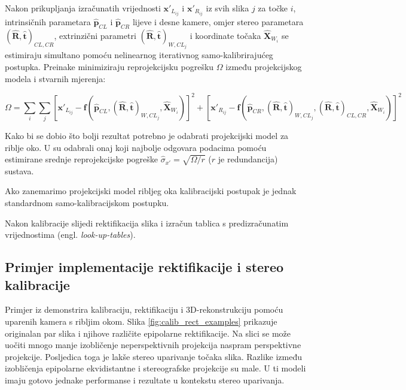 \documentclass[../seminar.tex]{subfiles}
\begin{document}
Nakon prikupljanja izračunatih vrijednosti $\boldsymbol{x'}_{L_{ij}}$ i $\boldsymbol{x'}_{R_{ij}}$ iz svih slika $j$ za točke $i$, intrinsičnih parametara $\hat{\boldsymbol{p}}_{CL}$ i $\hat{\boldsymbol{p}}_{CR}$ 
lijeve i desne kamere, omjer stereo parametara $(\hat{\boldsymbol{R}},\hat{\boldsymbol{t}})_{CL,CR}$, extrinzični parametri $(\hat{\boldsymbol{R}},\hat{\boldsymbol{t}})_{W,CL_j}$ 
i koordinate točaka $\hat{\boldsymbol{X}}_{W_i}$ se estimiraju simultano pomoću nelinearnog iterativnog samo-kalibrirajućeg postupka. Preinake minimiziraju reprojekcijsku pogrešku $\Omega$ između 
projekcijskog modela i stvarnih mjerenja:

\begin{equation}
\label{eq:reprojection_error_minimization}
\Omega = \sum\limits_{i}\sum\limits_{j}[\boldsymbol{x}'_{L_{ij}} - \boldsymbol{f}(\hat{\boldsymbol{p}}_{CL},(\hat{\boldsymbol{R}},\hat{\boldsymbol{t}})_{W,CL_j},\hat{\boldsymbol{X}}_{W_i})]^2 + [\boldsymbol{x}'_{R_{ij}} - \boldsymbol{f}(\hat{\boldsymbol{p}}_{CR},(\hat{\boldsymbol{R}},\hat{\boldsymbol{t}})_{W,CL_j},(\hat{\boldsymbol{R}},\hat{\boldsymbol{t}})_{CL,CR},\hat{\boldsymbol{X}}_{W_i})]^2
\end{equation}

Kako bi se dobio što bolji rezultat potrebno je odabrati projekcijski model za riblje oko. U \cite{Abraham} su odabrali onaj koji najbolje odgovara 
podacima pomoću estimirane srednje reprojekcijske pogreške $\hat{\sigma}_{x'} = \sqrt{\Omega/r}$  ($r$ je redundancija) sustava.

Ako zanemarimo projekcijski model ribljeg oka kalibracijski postupak je jednak standardnom samo-kalibracijskom postupku. 

Nakon kalibracije slijedi rektifikacija slika i izračun tablica s predizračunatim vrijednostima (engl. \textit{look-up-tables}). 


\subsection{Primjer implementacije rektifikacije i stereo kalibracije}

Primjer iz \cite{Abraham} demonstrira kalibraciju, rektifikaciju i 3D-rekonstrukciju pomoću uparenih kamera s ribljim okom. Slika \ref{fig:calib_rect_examples} prikazuje originalan par slika i njihove različite epipolarne rektifikacije.
Na slici se može uočiti mnogo manje izobličenje neperspektivnih projekcija naspram perspektivne projekcije. Posljedica toga je lakše stereo uparivanje točaka slika. Razlike između izobličenja epipolarne ekvidistantne i stereografske projekcije su male. U \cite{Abraham} ti modeli imaju gotovo jednake performanse i rezultate u kontekstu stereo uparivanja.
\end{document}
